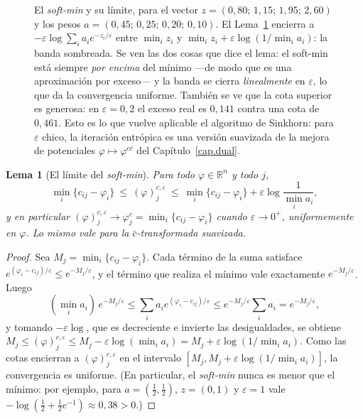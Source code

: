 \documentclass[12pt, a4paper]{amsbook}
\newcommand{\ve}{\varepsilon}
\newcommand{\R}{{\mathbb R}}
\newtheorem{lema}[teo]{Lema}
\theoremstyle{remark}
\theoremstyle{definition}
\numberwithin{section}{chapter}
\numberwithin{subsection}{section}
\numberwithin{equation}{section}
\numberwithin{figure}{chapter}
\begin{document}
\begin{figure}[ht]
\caption{El \emph{soft-min} y su límite, para el vector
$z=(0{,}80;\,1{,}15;\,1{,}95;\,2{,}60)$ y los pesos
$a=(0{,}45;\,0{,}25;\,0{,}20;\,0{,}10)$. El Lema~\ref{lema.softmin} encierra
a $-\ve\log\sum_ia_ie^{-z_i/\ve}$ entre $\min_iz_i$ y
$\min_iz_i+\ve\log(1/\min_ia_i)$: la banda sombreada. Se ven las dos cosas
que dice el lema: el soft-min está siempre \emph{por encima} del mínimo —de
modo que es una aproximación por exceso— y la banda se cierra
\emph{linealmente} en $\ve$, lo que da la convergencia uniforme. También se ve
que la cota superior es generosa: en $\ve=0{,}2$ el exceso real es $0{,}141$
contra una cota de $0{,}461$. Esto es lo que vuelve aplicable el algoritmo de
Sinkhorn: para $\ve$ chico, la iteración entrópica es una versión suavizada
de la mejora de potenciales $\varphi\mapsto\varphi^{c\bar c}$ del
Capítulo~\ref{cap.dual}.}
\label{fig.softmin}
\end{figure}

\begin{lema}[El límite del \emph{soft-min}]\label{lema.softmin}
Para todo $\varphi\in\R^n$ y todo $j$,
\[
\min_i\{c_{ij}-\varphi_i\}
\ \le\ (\varphi)^{c,\varepsilon}_j\ \le\ \min_i\{c_{ij}-\varphi_i\}+\varepsilon\log\frac1{\min_ia_i},
\]
y en particular $(\varphi)^{c,\varepsilon}_j\to\varphi^c_j=\min_i\{c_{ij}-\varphi_i\}$
cuando $\varepsilon\to0^+$, uniformemente en $\varphi$. Lo mismo vale para la
$\bar c$-transformada suavizada.
\end{lema}

\begin{proof}
Sea $M_j=\min_i\{c_{ij}-\varphi_i\}$. Cada término de la suma satisface
$e^{(\varphi_i-c_{ij})/\varepsilon}\le e^{-M_j/\varepsilon}$, y el término que
realiza el mínimo vale exactamente $e^{-M_j/\varepsilon}$. Luego
\[
(\min_ia_i)\,e^{-M_j/\varepsilon}\le\sum_ia_ie^{(\varphi_i-c_{ij})/\varepsilon}\le e^{-M_j/\varepsilon}\sum_ia_i=e^{-M_j/\varepsilon},
\]
y tomando $-\varepsilon\log$, que es decreciente e invierte las
desigualdades, se obtiene
$M_j\le(\varphi)^{c,\varepsilon}_j\le M_j-\varepsilon\log(\min_ia_i)
=M_j+\varepsilon\log(1/\min_ia_i)$. Como las
cotas encierran a $(\varphi)^{c,\varepsilon}_j$ en el intervalo
$[M_j,M_j+\varepsilon\log(1/\min_ia_i)]$, la convergencia es
uniforme. (En particular, el \emph{soft-min} nunca es menor que el mínimo:
por ejemplo, para $a=(\frac12,\frac12)$, $z=(0,1)$ y $\varepsilon=1$ vale
$-\log(\frac12+\frac12e^{-1})\approx0{,}38>0$.)
\end{proof}
\end{document}
